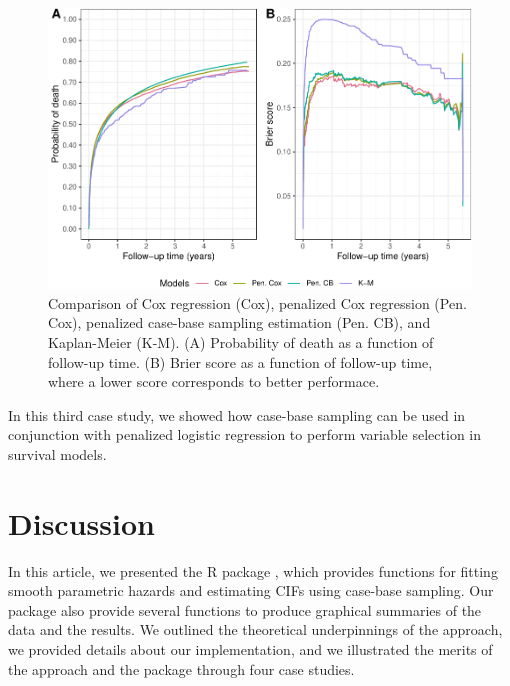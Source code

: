 \begin{Schunk}
\begin{figure}[ht]
\includegraphics[width=\textwidth,keepaspectratio=true]{../figures/riskregressionBrier-1} \caption{\label{fig:cs3FinalBrier} Comparison of Cox regression (Cox), penalized Cox regression (Pen. Cox), penalized case-base sampling estimation (Pen. CB), and Kaplan-Meier (K-M). (A)  Probability of death as a function of follow-up time. (B) Brier score as a function of follow-up time, where a lower score corresponds to better performace.}\label{fig:riskregressionBrier}
\end{figure}
\end{Schunk}

In this third case study, we showed how case-base sampling can be used
in conjunction with penalized logistic regression to perform variable
selection in survival models.

\hypertarget{discussion}{%
\section{Discussion}\label{discussion}}

In this article, we presented the \textsf{R} package ,
which provides functions for fitting smooth parametric hazards and
estimating CIFs using case-base sampling. Our package also provide
several functions to produce graphical summaries of the data and the
results. We outlined the theoretical underpinnings of the approach, we
provided details about our implementation, and we illustrated the merits
of the approach and the package through four case studies.

